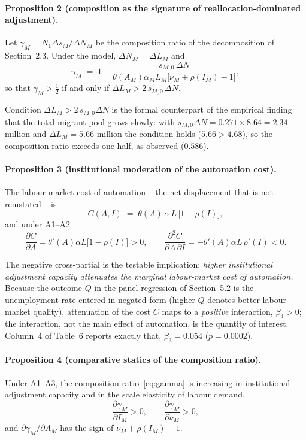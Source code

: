 \documentclass[12pt]{article}
\begin{document}
\paragraph{Proposition 2 (composition as the signature of reallocation-dominated adjustment).} Let $\gamma_M=N_1\Delta s_M/\Delta N_M$ be the composition ratio of the decomposition of Section~2.3. Under the model, $\Delta N_M=\Delta L_M$ and
\begin{equation}
\gamma_M \;=\; 1-\frac{s_{M,0}\,\Delta N}{\theta(A_M)\alpha_M L_M\bigl[\nu_M+\rho(I_M)-1\bigr]},
\label{eq:gamma}
\end{equation}
so that $\gamma_M>\tfrac12$ if and only if $\Delta L_M>2\,s_{M,0}\,\Delta N$.

Condition $\Delta L_M>2\,s_{M,0}\Delta N$ is the formal counterpart of the empirical finding that the total migrant pool grows slowly: with $s_{M,0}\Delta N=0.271\times8.64=2.34$ million and $\Delta L_M=5.66$ million the condition holds ($5.66>4.68$), so the composition ratio exceeds one-half, as observed ($0.586$).

\paragraph{Proposition 3 (institutional moderation of the automation cost).} The labour-market cost of automation -- the net displacement that is not reinstated -- is
\begin{equation}
C(A,I) \;=\; \theta(A)\,\alpha\,L\,\bigl[1-\rho(I)\bigr],
\label{eq:cost}
\end{equation}
and under A1--A2
\begin{equation}
\frac{\partial C}{\partial A}=\theta'(A)\alpha L\bigl[1-\rho(I)\bigr]>0,
\qquad
\frac{\partial^2 C}{\partial A\,\partial I}=-\theta'(A)\alpha L\,\rho'(I)<0 .
\end{equation}

The negative cross-partial is the testable implication: \emph{higher institutional adjustment capacity attenuates the marginal labour-market cost of automation.} Because the outcome $Q$ in the panel regression of Section~5.2 is the unemployment rate entered in negated form (higher $Q$ denotes better labour-market quality), attenuation of the cost $C$ maps to a \emph{positive} interaction, $\beta_3>0$; the interaction, not the main effect of automation, is the quantity of interest. Column~4 of Table~6 reports exactly that, $\beta_3=0.054$ ($p=0.0002$).

\paragraph{Proposition 4 (comparative statics of the composition ratio).} Under A1--A3, the composition ratio~\eqref{eq:gamma} is increasing in institutional adjustment capacity and in the scale elasticity of labour demand,
\begin{equation}
\frac{\partial\gamma_M}{\partial I_M}>0,\qquad
\frac{\partial\gamma_M}{\partial\nu_M}>0,
\end{equation}
and $\partial\gamma_M/\partial A_M$ has the sign of $\nu_M+\rho(I_M)-1$.
\end{document}
